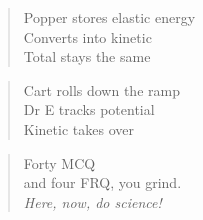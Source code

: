 \vspace*{\fill}
\begin{verse}
Popper stores elastic energy \\
Converts into kinetic \\
Total stays the same 
\end{verse}
\vspace{\fill}
\begin{verse}
Cart rolls down the ramp \\
Dr E tracks potential \\
Kinetic takes over 
\end{verse}
\vspace{\fill}
\begin{verse}
Forty MCQ\\
and four FRQ, you grind.\\
\emph{Here, now, do science!}
\end{verse}
\vspace*{\fill}
